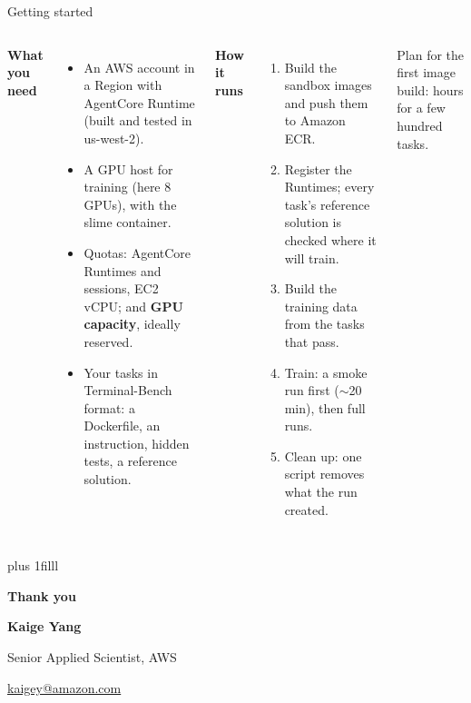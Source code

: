 \begin{frame}{Getting started}
\begin{columns}[T]
{\normalsize\textbf{What you need}}
\begin{itemize}\small\setlength{\itemsep}{1.2mm}
\item An AWS account in a Region with AgentCore Runtime (built and tested in us-west-2).
\item A GPU host for training (here 8 GPUs), with the slime container.
\item Quotas: AgentCore Runtimes and sessions, EC2 vCPU; and \textbf{GPU capacity}, ideally reserved.
\item Your tasks in Terminal-Bench format: a Dockerfile, an instruction, hidden tests, a reference solution.
\end{itemize}
{\normalsize\textbf{How it runs}}
\begin{enumerate}\small\setlength{\itemsep}{1.2mm}
\item Build the sandbox images and push them to Amazon ECR.
\item Register the Runtimes; every task's reference solution is checked where it will train.
\item Build the training data from the tasks that pass.
\item Train: a smoke run first ($\sim$20\,min), then full runs.
\item Clean up: one script removes what the run created.
\end{enumerate}
\vspace{1mm}
{\footnotesize Plan for the first image build: hours for a few hundred tasks.\par}
\end{columns}
\par\vskip 0pt plus 1filll
\end{frame}

{
\begin{frame}[plain]
\vfill
{\fontsize{22}{26}\selectfont\bfseries\color{white}Thank you\par}
\vspace{3mm}
{\small\bfseries\color{white}Kaige Yang\par}
{\small\color{inkmuted}Senior Applied Scientist, AWS\par}
{\small\color{inkmuted}\href{mailto:kaigey@amazon.com}{kaigey@amazon.com}\par}
\vspace{2mm}
\vfill
\end{frame}}


